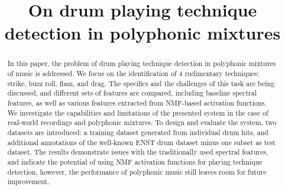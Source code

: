 \documentclass{article}
\title{On drum playing technique detection in polyphonic mixtures}
\begin{document}
%
\maketitle
%
\begin{abstract}

In this paper, the problem of drum playing technique detection in polyphonic mixtures of music is addressed. We focus on the identification of 4 rudimentary techniques: strike, buzz roll, flam, and drag. The specifics and the challenges of this task are being discussed, and different sets of features are compared, including baseline spectral features, as well as various features extracted from NMF-based activation functions. We investigate the capabilities and limitations of
the presented system in the case of real-world recordings and polyphonic mixtures. To design and evaluate the system, two datasets are introduced: a training dataset generated from individual drum hits, and additional annotations of the well-known ENST drum dataset minus one subset as test dataset. The results demonstrate issues with the traditionally used spectral features, and indicate the potential of using NMF activation functions for playing technique detection, however, the performance of polyphonic music still leaves room for future improvement.
\end{abstract}
\end{document}
